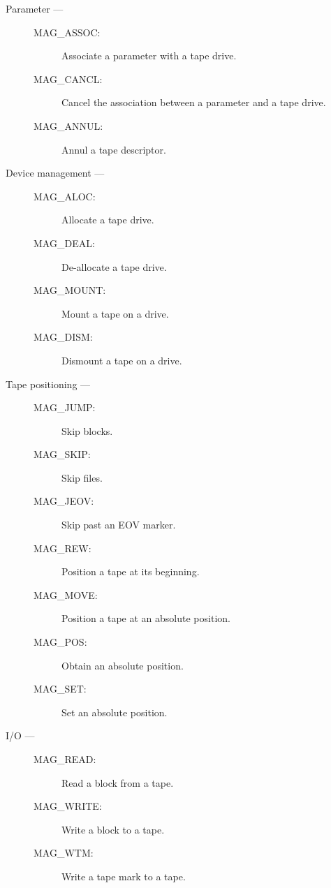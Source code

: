 \begin{description}

\item [Parameter ---]

\begin{description}
\item [MAG\_ASSOC:]  Associate a parameter with a tape drive.
\item [MAG\_CANCL:]  Cancel the association between a parameter and a tape
 drive.
\item [MAG\_ANNUL:]  Annul a tape descriptor.
\end{description}

\item [Device management ---]

\begin{description}
\item [MAG\_ALOC:]  Allocate a tape drive.
\item [MAG\_DEAL:]  De-allocate a tape drive.
\item [MAG\_MOUNT:]  Mount a tape on a drive.
\item [MAG\_DISM:]  Dismount a tape on a drive.
\end{description}

\item [Tape positioning ---]

\begin{description}
\item [MAG\_JUMP:]  Skip blocks.
\item [MAG\_SKIP:]  Skip files.
\item [MAG\_JEOV:]  Skip past an EOV marker.
\item [MAG\_REW:]  Position a tape at its beginning.
\item [MAG\_MOVE:]  Position a tape at an absolute position.
\item [MAG\_POS:]  Obtain an absolute position.
\item [MAG\_SET:]  Set an absolute position.
\end{description}

\item [I/O ---]

\begin{description}
\item [MAG\_READ:]  Read a block from a tape.
\item [MAG\_WRITE:]  Write a block to a tape.
\item [MAG\_WTM:]  Write a tape mark to a tape.
\end{description}

\end{description}

